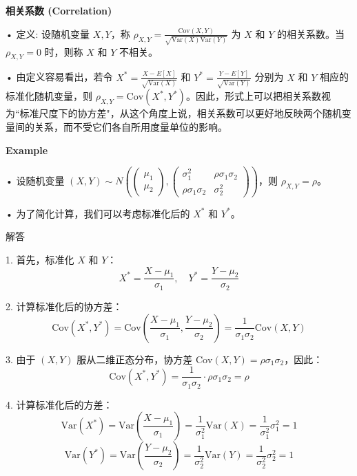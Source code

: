 \documentclass[UTF8]{report}
\theoremstyle{MyLineTheoremStyle} %
\theoremstyle{MyBlockTheoremStyle} %
\theoremstyle{MySubsubsectionStyle} %
\begin{document}
\vspace{1cm}

\textbf{相关系数 (Correlation)}\par
• 定义: 设随机变量 $X, Y$，称 $\rho_{X,Y} = \frac{\text{Cov}(X, Y)}{\sqrt{\text{Var}(X) \text{Var}(Y)}}$ 为 $X$ 和 $Y$ 的相关系数。当 $\rho_{X,Y} = 0$ 时，则称 $X$ 和 $Y$ 不相关。\par
• 由定义容易看出，若令 $X^* = \frac{X - E[X]}{\sqrt{\text{Var}(X)}}$ 和 $Y^* = \frac{Y - E[Y]}{\sqrt{\text{Var}(Y)}}$ 分别为 $X$ 和 $Y$ 相应的标准化随机变量，则 $\rho_{X,Y} = \text{Cov}(X^*, Y^*)$。因此，形式上可以把相关系数视为“标准尺度下的协方差"，从这个角度上说，相关系数可以更好地反映两个随机变量间的关系，而不受它们各自所用度量单位的影响。\par

\vspace{1cm}

\textbf{Example}\par
• 设随机变量 $(X, Y) \sim N\left(\begin{pmatrix} \mu_1 \\ \mu_2 \end{pmatrix}, \begin{pmatrix} \sigma_1^2 & \rho \sigma_1 \sigma_2 \\ \rho \sigma_1 \sigma_2 & \sigma_2^2 \end{pmatrix}\right)$，则 $\rho_{X,Y} = \rho$。\par
• 为了简化计算，我们可以考虑标准化后的 $X^*$ 和 $Y^*$。\par

解答

1. 首先，标准化 $X$ 和 $Y$：
\[
X^* = \frac{X - \mu_1}{\sigma_1}, \quad Y^* = \frac{Y - \mu_2}{\sigma_2}
\]

2. 计算标准化后的协方差：
\[
\text{Cov}(X^*, Y^*) = \text{Cov}\left(\frac{X - \mu_1}{\sigma_1}, \frac{Y - \mu_2}{\sigma_2}\right) = \frac{1}{\sigma_1 \sigma_2} \text{Cov}(X, Y)
\]

3. 由于 $(X, Y)$ 服从二维正态分布，协方差 $\text{Cov}(X, Y) = \rho \sigma_1 \sigma_2$，因此：
\[
\text{Cov}(X^*, Y^*) = \frac{1}{\sigma_1 \sigma_2} \cdot \rho \sigma_1 \sigma_2 = \rho
\]

4. 计算标准化后的方差：
\[
\text{Var}(X^*) = \text{Var}\left(\frac{X - \mu_1}{\sigma_1}\right) = \frac{1}{\sigma_1^2} \text{Var}(X) = \frac{1}{\sigma_1^2} \sigma_1^2 = 1
\]
\[
\text{Var}(Y^*) = \text{Var}\left(\frac{Y - \mu_2}{\sigma_2}\right) = \frac{1}{\sigma_2^2} \text{Var}(Y) = \frac{1}{\sigma_2^2} \sigma_2^2 = 1
\]
\end{document}
